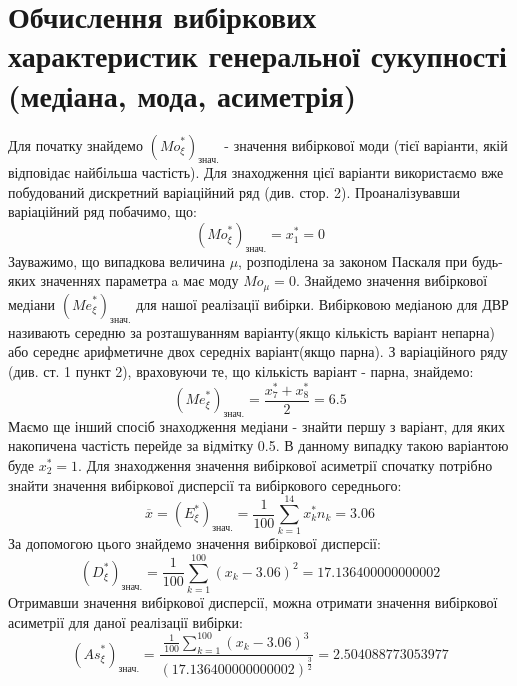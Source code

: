 \documentclass{article}
\begin{document}
\section{Обчислення вибіркових характеристик генеральної 
сукупності (медіана, мода, асиметрія)}
Для початку знайдемо $({Mo}_\xi^*)_{\text{знач.}}$ - 
значення вибіркової моди (тієї варіанти, якій відповідає 
найбільша частість). Для знаходження цієї варіанти використаємо
вже побудований дискретний варіаційний ряд (див. стор. 2).
Проаналізувавши варіаційний ряд побачимо, що:
$$({Mo}_\xi^*)_{\text{знач.}} = x_1^* = 0$$
Зауважимо, що випадкова величина $\mu$, розподілена за 
законом Паскаля при будь-яких значеннях параметра a
має моду ${Mo}_\mu = 0$.
\newline
\newline
Знайдемо значення вибіркової медіани $({Me}_\xi^*)_{\text{знач.}}$ 
для нашої реалізації вибірки. Вибірковою медіаною для ДВР називають 
середню за розташуванням варіанту(якщо кількість варіант непарна) 
або середнє арифметичне двох середніх варіант(якщо парна).
З варіаційного ряду (див. ст. 1 
пункт 2), враховуючи те, що кількість варіант - парна, 
знайдемо:$$ ({Me}_\xi^*)_{\text{знач.}} = \frac{x_7^* + x_8^*}
{2} = 6.5 $$
Маємо ще інший спосіб знаходження медіани - знайти першу з варіант, 
для яких накопичена частість перейде за відмітку 0.5. В данному випадку 
такою варіантою буде $x_2^* = 1.$
\newline
Для знаходження значення вибіркової асиметрії спочатку потрібно 
знайти значення вибіркової дисперсії та вибіркового середнього: 
$$\overline{x} = (E^*_{\xi})_{\text{знач.}} = \frac{1}{100} 
\sum_{k = 1}^{14} x_k^* n_k = 3.06$$
За допомогою цього знайдемо значення вибіркової дисперсії:
$$(D^*_{\xi})_{\text{знач.}} = \frac{1}{100} \sum_{k = 1}^{100}
(x_k - 3.06)^2 = 17.136400000000002$$
Отримавши значення вибіркової дисперсії, можна отримати значення
вибіркової асиметрії для даної реалізації вибірки:
$$({As}_{\xi}^*)_{\text{знач.}} = \frac{\frac{1}{100}
\sum_{k = 1}^{100}(x_k - 3.06)^3}{(17.136400000000002)^
{\frac{3}{2}}} = 2.504088773053977$$
\end{document}
